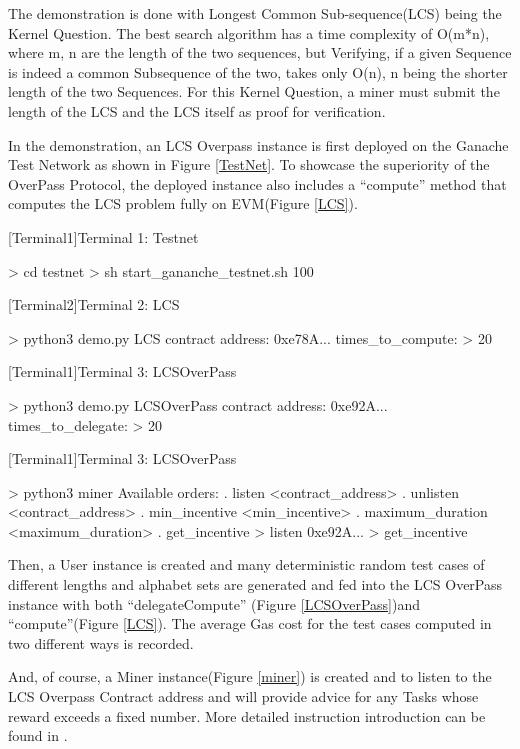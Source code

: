 The demonstration is done with Longest Common Sub-sequence(LCS)\cite{holmgren_et_al:LIPIcs.ICALP.2022.73} being the Kernel Question. The best search algorithm has a time complexity of O(m*n), where m, n are the length of the two sequences, but Verifying, if a given Sequence is indeed a common Subsequence of the two, takes only O(n), n being the shorter length of the two Sequences. For this Kernel Question, a miner must submit the length of the LCS and the LCS itself as proof for verification.

In the demonstration, an LCS Overpass instance is first deployed on the Ganache Test Network as shown in Figure \ref{TestNet}. To showcase the superiority of the OverPass Protocol, the deployed instance also includes a “compute” method that computes the LCS problem fully on EVM(Figure \ref{LCS}).
\begin{algorithm}[H]
    [Terminal1]{Terminal 1: Testnet} \label{TestNet}
    \begin{algorithmic}[1]
            \State > cd testnet 
            \State > sh start\_gananche\_testnet.sh 100 
    \end{algorithmic}
\end{algorithm}
\begin{algorithm}[H]
    [Terminal2]{Terminal 2: LCS} \label{LCS}
    \begin{algorithmic}[1]
            \State > python3 demo.py LCS
            \State  contract address: 0xe78A...
            \State  times\_to\_compute: > 20
    \end{algorithmic}
\end{algorithm}

\begin{algorithm}[H]
    [Terminal1]{Terminal 3: LCSOverPass} \label{LCSOverPass}
    \begin{algorithmic}[1]
            \State > python3 demo.py LCSOverPass
            \State  contract address: 0xe92A...
            \State  times\_to\_delegate: > 20
    \end{algorithmic}
\end{algorithm}
\begin{algorithm}[H]
    [Terminal1]{Terminal 3: LCSOverPass} \label{miner}
    \begin{algorithmic}[1]
            \State > python3 miner
            \State Available orders:
            . listen <contract\_address>
            . unlisten <contract\_address>
            . min\_incentive <min\_incentive>
            . maximum\_duration <maximum\_duration>
            . get\_incentive
            \State > listen 0xe92A...
            \State > get\_incentive
    \end{algorithmic}
\end{algorithm}
Then, a User instance is created and many deterministic random test cases of different lengths and alphabet sets are generated and fed into the LCS OverPass instance with both “delegateCompute” (Figure \ref{LCSOverPass})and “compute”(Figure \ref{LCS}). The average Gas cost for the test cases computed in two different ways is recorded. 

And, of course, a Miner instance(Figure \ref{miner}) is created and to listen to the LCS Overpass Contract address and will provide advice for any Tasks whose reward exceeds a fixed number. More detailed instruction introduction can be found in \cite{mu_nathanael_liu_woo_chen_harish_2022}.
